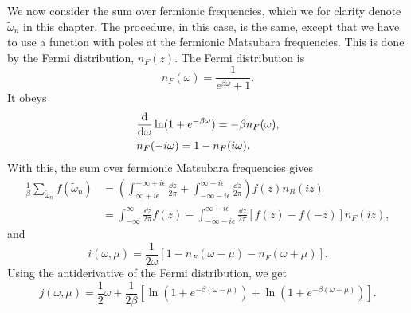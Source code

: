 We now consider the sum over fermionic frequencies, which we for clarity denote $\tilde \omega_n$ in this chapter.
The procedure, in this case, is the same, except that we have to use a function with poles at the fermionic Matsubara frequencies.
This is done by the Fermi distribution, $n_F(z)$.
The Fermi distribution is
%
\begin{equation}
    n_F(\omega) = \frac{1}{e^{\beta \omega} + 1}.
\end{equation}
%
It obeys
%
\begin{align}
    &\odv{}{\omega} \ln(1 + e^{-\beta \omega}) = - \beta n_F(\omega), \\
    & n_F(- i\omega) = 1 - n_F(i\omega).
\end{align}
%
With this, the sum over fermionic Matsubara frequencies gives
%
\begin{align}
    \frac{1}{\beta} \sum_{\tilde \omega_n} f(\tilde \omega_n)
    & = \left(
        \int_{\infty + i \epsilon}^{-\infty + i \epsilon} \frac{\dd z}{2 \pi} 
        + \int_{-\infty - i \epsilon}^{\infty - i \epsilon}\frac{\dd z}{2 \pi}
    \right) 
    f(z) n_B(i z) \\
    & =
    \int_{-\infty}^{\infty} \frac{\dd z}{2 \pi} f(z)
    -
    \int_{-\infty - i \epsilon}^{\infty - i \epsilon}\frac{\dd z}{2 \pi}
    \left[
        f(z) - f(-z)
    \right]
    n_F(iz),
\end{align}
%
and 
%
\begin{equation}
    i(\omega, \mu) = \frac{1}{2 \omega} [1 - n_F(\omega - \mu) - n_F(\omega + \mu)].
\end{equation}
%
Using the antiderivative of the Fermi distribution, we get
%
\begin{equation}
    j(\omega, \mu) 
    = \frac{1}{2} \omega 
    + \frac{1}{2 \beta }
    \left[
        \ln\left(1 + e^{-\beta(\omega - \mu)}\right)
        + \ln\left(1 + e^{-\beta(\omega + \mu)}\right)
    \right].
\end{equation}


